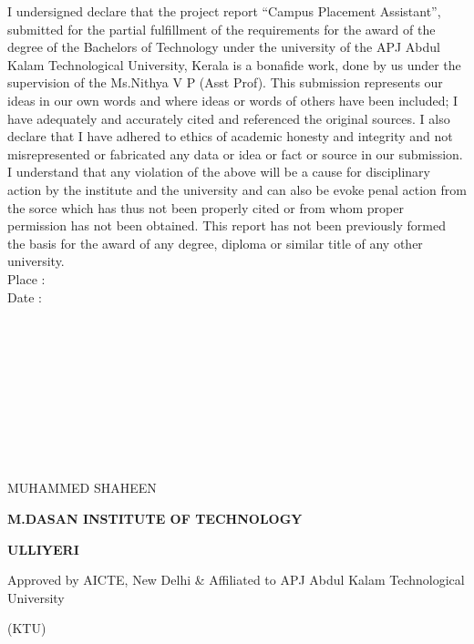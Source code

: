 \documentclass[12pt]{article}
\begin{document}
\begin{changemargin}{0.5cm}{0.5cm}
I undersigned declare that the project report “Campus Placement Assistant”, submitted for the partial fulfillment of the requirements for
the award of the degree of the Bachelors of Technology under the university of
the APJ Abdul Kalam Technological University, Kerala is a bonafide work,
done by us under the supervision of the Ms.Nithya V P (Asst Prof). This
submission represents our ideas in our own words and where ideas or words
of others have been included; I have adequately and accurately cited and
referenced the original sources. I also declare that I have adhered to ethics
of academic honesty and integrity and not misrepresented or fabricated any
data or idea or fact or source in our submission. I understand that any
violation of the above will be a cause for disciplinary action by the
institute and the university and can also be evoke penal action from the sorce
which has thus not been properly cited or from whom proper permission has
not been obtained. This report has not been previously formed the basis for
the award of any degree, diploma or similar title of any other university.
\\Place :
\\Date :
\\
\\
\\
\\
\\
\\
\\
\\
\\
\\
 \begin{center}{MUHAMMED SHAHEEN}\end{center}

\thispagestyle{empty}

\newpage
\vspace*{1px}
\begin{center}\large\bf{M.DASAN INSTITUTE OF TECHNOLOGY}\end{center}
\begin{center}\large\bf{ULLIYERI} \end{center}
\begin{center}Approved by AICTE, New Delhi \& Affiliated to APJ Abdul Kalam Technological University\end{center}
\begin{center}(KTU)\end{center}


\end{changemargin}
\end{document}
